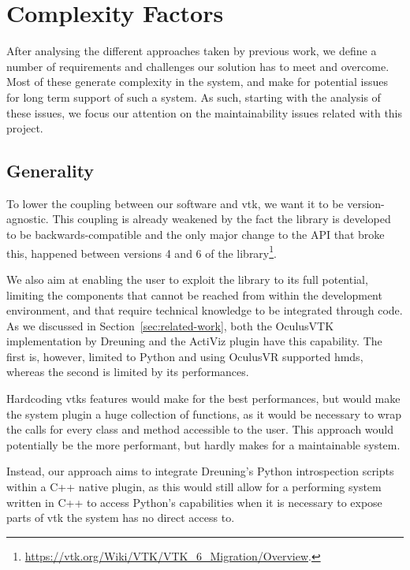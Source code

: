 \chapter{Complexity Factors}
\label{ch:unmaintainability}

After analysing the different approaches taken by previous work, we define a number of requirements and challenges our solution has to meet and overcome. Most of these generate complexity in the system, and make for potential issues for long term support of such a system. As such, starting with the analysis of these issues, we focus our attention on the maintainability issues related with this project.

\section{Generality}
\label{sec:complexity-generality}

To lower the coupling between our software and \acrshort{vtk}, we want it to be version-agnostic. This coupling is already weakened by the fact the library is developed to be backwards-compatible and the only major change to the API that broke this, happened between versions 4 and 6 of the library\footnote{\url{https://vtk.org/Wiki/VTK/VTK\_6\_Migration/Overview}.}. 

We also aim at enabling the user to exploit the library to its full potential, limiting the components that cannot be reached from within the development environment, and that require technical knowledge to be integrated through code. As we discussed in Section~\ref{sec:related-work}, both the OculusVTK implementation by Dreuning and the ActiViz plugin have this capability. The first is, however, limited to Python and using OculusVR supported \acrshort{hmd}s, whereas the second is limited by its performances. 

Hardcoding \acrshort{vtk}s features would make for the best performances, but would make the system plugin a huge collection of functions, as it would be necessary to wrap the calls for every class and method accessible to the user. This approach would potentially be the more performant, but hardly makes for a maintainable system.

Instead, our approach aims to integrate Dreuning's Python introspection scripts within a C++ native plugin, as this would still allow for a performing system written in C++ to access Python's capabilities when it is necessary to expose parts of \acrshort{vtk} the system has no direct access to.

